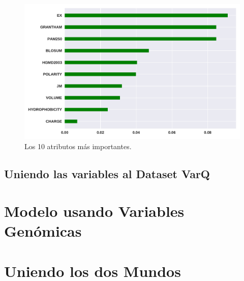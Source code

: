 \begin{figure}[H]
    \centering
    \includegraphics[scale=0.73]{documents/latex/figures/3/importance_1.pdf}
    \caption{Los 10 atributos más importantes.}
    \label{fig:importance_1}
\end{figure}


\subsection{Uniendo las variables al Dataset VarQ}

\section{Modelo usando Variables Genómicas}


\section{Uniendo los dos Mundos}


